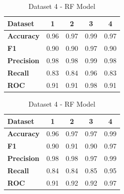 \begin{table}[H]
\begin{subtable}[H]{0.45\textwidth}
\begin{tabular}{|l|c|c|c|c|}
      \hline
      \textbf{Dataset}   & \textbf{1} & \textbf{2} & \textbf{3} & \textbf{4} \\
      \hline
      \textbf{Accuracy}  & 0.96       & 0.97       & 0.99       & 0.97       \\
      \textbf{F1}        & 0.90       & 0.90       & 0.97       & 0.90       \\
      \textbf{Precision} & 0.98       & 0.98       & 0.99       & 0.98       \\
      \textbf{Recall}    & 0.83       & 0.84       & 0.96       & 0.83       \\
      \textbf{ROC}       & 0.91       & 0.91       & 0.98       & 0.91       \\
      \hline
    \end{tabular}
    \caption{Dataset 3 - RF Model}\label{subtab:dataset_3_rf_model}
  \end{subtable}
  \quad
  \begin{subtable}[H]{0.45\textwidth}
    \centering
    \begin{tabular}{|l|c|c|c|c|}
      \hline
      \textbf{Dataset}   & \textbf{1} & \textbf{2} & \textbf{3} & \textbf{4} \\
      \hline
      \textbf{Accuracy}  & 0.96       & 0.97       & 0.97       & 0.99       \\
      \textbf{F1}        & 0.90       & 0.91       & 0.90       & 0.97       \\
      \textbf{Precision} & 0.98       & 0.98       & 0.97       & 0.99       \\
      \textbf{Recall}    & 0.84       & 0.84       & 0.85       & 0.95       \\
      \textbf{ROC}       & 0.91       & 0.92       & 0.92       & 0.97       \\
      \hline
    \end{tabular}
    \caption{Dataset 4 - RF Model}\label{subtab:dataset_4_rf_model}
  \end{subtable}
\end{table}

